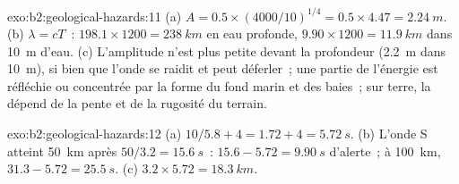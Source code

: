 \begin{solution}{exo:b2:geological-hazards:11}
(a) $A = 0.5 \times (4000/10)^{1/4} = 0.5 \times 4.47 = \qty{2.24}{m}$. (b) $\lambda = cT$~:
$198.1 \times 1200 = \qty{238}{km}$ en eau profonde, $9.90 \times 1200 = \qty{11.9}{km}$
dans \qty{10}{m} d'eau. (c) L'amplitude n'est plus petite devant la profondeur
(\qty{2.2}{m} dans \qty{10}{m}), si bien que l'onde se raidit et peut déferler~; une
partie de l'énergie est réfléchie ou concentrée par la forme du fond marin et des
baies~; sur terre, la  dépend de la pente et de la rugosité du terrain.
\end{solution}

\begin{solution}{exo:b2:geological-hazards:12}
(a) $10/5.8 + 4 = 1.72 + 4 = \qty{5.72}{s}$. (b) L'onde S atteint \qty{50}{km} après $50/3.2 =
\qty{15.6}{s}$~: $15.6 - 5.72 = \qty{9.90}{s}$ d'alerte~; à \qty{100}{km}, $31.3 - 5.72 =
\qty{25.5}{s}$. (c) $3.2 \times 5.72 = \qty{18.3}{km}$.
\end{solution}


